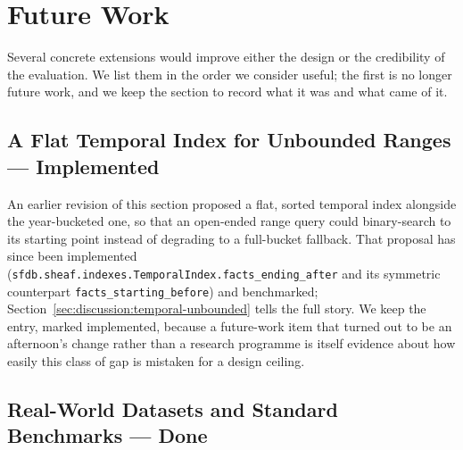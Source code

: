 \section{Future Work}
\label{sec:future}

Several concrete extensions would improve either the design or the
credibility of the evaluation. We list them in the order we consider
useful; the first is no longer future work, and we keep the section to
record what it was and what came of it.

\subsection{A Flat Temporal Index for Unbounded Ranges --- Implemented}
\label{sec:future:global-index}

An earlier revision of this section proposed a flat, sorted temporal
index alongside the year-bucketed one, so that an open-ended range query
could binary-search to its starting point instead of degrading to a
full-bucket fallback. That proposal has since been implemented
(\texttt{sfdb.sheaf.indexes.TemporalIndex.facts\_ending\_after} and its
symmetric counterpart \texttt{facts\_starting\_before}) and benchmarked;
Section~\ref{sec:discussion:temporal-unbounded} tells the full story. We
keep the entry, marked implemented, because a future-work item that
turned out to be an afternoon's change rather than a research programme
is itself evidence about how easily this class of gap is mistaken for a
design ceiling.

\subsection{Real-World Datasets and Standard Benchmarks --- Done}
\label{sec:future:real-data}

